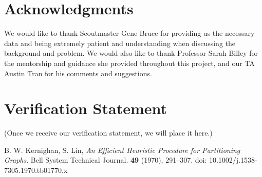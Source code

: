 \documentclass{amsart}
\theoremstyle{definition}
\theoremstyle{remark}
\numberwithin{equation}{section}
\begin{document}
\section*{Acknowledgments}
We would like to thank Scoutmaster Gene Bruce for providing us the necessary data and being extremely patient and understanding when discussing the background and problem. We would also like to thank Professor Sarah Billey for the mentorship and guidance she provided throughout this project, and our TA Austin Tran for his comments and suggestions. 

\section*{Verification Statement}
(Once we receive our verification statement, we will place it here.)




\begin{thebibliography}{10}

 B. W. Kernighan, S. Lin, \textit{An Efficient Heuristic Procedure for Partitioning Graphs}. Bell System Technical Journal. \textbf{49} (1970), 291--307. doi: 10.1002/j.1538-7305.1970.tb01770.x

\end{thebibliography}
\end{document}
